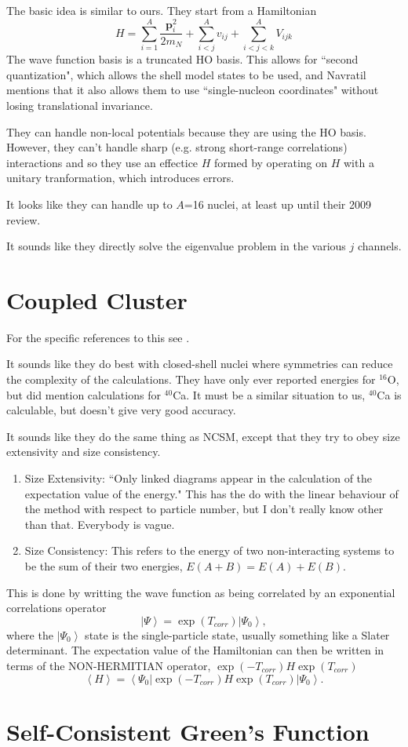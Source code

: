\documentclass[12pt]{extarticle}
\newcommand{\ket}[1]{\left| #1 \right>}
\newcommand{\bra}[1]{\left< #1 \right|}
\begin{document}
The basic idea is similar to ours. They start from a Hamiltonian
\begin{equation}
   H = \sum\limits_{i=1}^A\frac{\mathbf{p}_i^2}{2m_N} + \sum\limits_{i<j}^A v_{ij} + \sum\limits_{i<j<k}^A V_{ijk}
\end{equation}
The wave function basis is a truncated HO basis. This allows for ``second quantization", which allows the shell model states to be used, and Navratil mentions that it also allows them to use ``single-nucleon coordinates" without losing translational invariance.

They can handle non-local potentials because they are using the HO basis. However, they can't handle sharp (e.g. strong short-range correlations) interactions and so they use an effectice $H$ formed by operating on $H$ with a unitary tranformation, which introduces errors.

It looks like they can handle up to $A$=16 nuclei, at least up until their 2009 review.

It sounds like they directly solve the eigenvalue problem in the various $j$ channels.

\section{Coupled Cluster}
For the specific references to this see \cite{lynn2013}.

It sounds like they do best with closed-shell nuclei where symmetries can reduce the complexity of the calculations. They have only ever reported energies for $^{16}$O, but did mention calculations for $^{40}$Ca. It must be a similar situation to us, $^{40}$Ca is calculable, but doesn't give very good accuracy.

It sounds like they do the same thing as NCSM, except that they try to obey size extensivity and size consistency.
\begin{enumerate}
   \item Size Extensivity: ``Only linked diagrams appear in the calculation of the expectation value of the energy." This has the do with the linear behaviour of the method with respect to particle number, but I don't really know other than that. Everybody is vague.
   \item Size Consistency: This refers to the energy of two non-interacting systems to be the sum of their two energies, $E(A+B)= E(A) + E(B)$.
\end{enumerate}

This is done by writting the wave function as being correlated by an exponential correlations operator
\begin{equation}
    \ket{\Psi} = \exp(T_{corr})\ket{\Psi_0},
\end{equation}
where the $\ket{\Psi_0}$ state is the single-particle state, usually something like a Slater determinant. The expectation value of the Hamiltonian can then be written in terms of the NON-HERMITIAN operator, $\exp(-T_{corr})H\exp(T_{corr})$
\begin{equation}
   \left<H\right> = \bra{\Psi_0}\exp(-T_{corr})H\exp(T_{corr})\ket{\Psi_0}.
\end{equation}

\section{Self-Consistent Green's Function}


\end{document}
